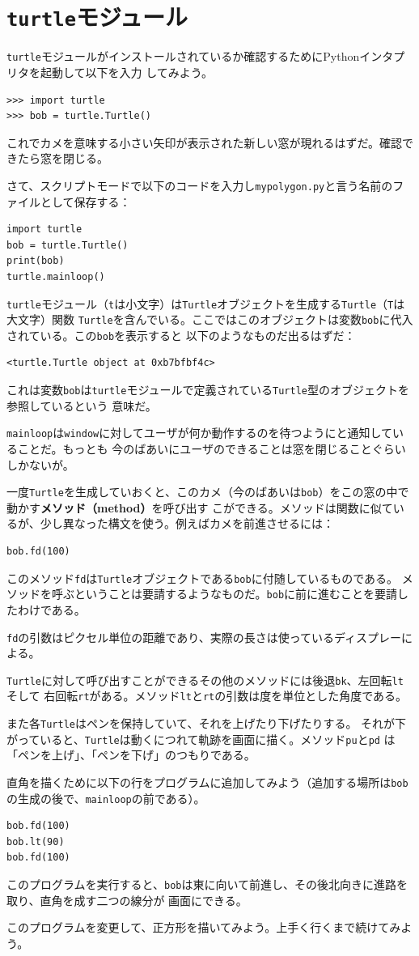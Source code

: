 \documentclass[a4j,12pt,makeidx]{jbook}
\begin{document}
\section{{\tt turtle}モジュール}
{\tt turtle}モジュールがインストールされているか確認するためにPythonインタプリタを起動して以下を入力
してみよう。
\begin{verbatim}
>>> import turtle
>>> bob = turtle.Turtle()
\end{verbatim}
これでカメを意味する小さい矢印が表示された新しい窓が現れるはずだ。確認できたら窓を閉じる。\par
さて、スクリプトモードで以下のコードを入力し{\tt mypolygon.py}と言う名前のファイルとして保存する：
\begin{verbatim}
import turtle
bob = turtle.Turtle()
print(bob)
turtle.mainloop()
\end{verbatim}
{\tt turtle}モジュール（{\tt t}は小文字）は{\tt Turtle}オブジェクトを生成する{\tt Turtle}（{\tt T}は大文字）関数
{\tt Turtle}を含んでいる。ここではこのオブジェクトは変数{\tt bob}に代入されている。この{\tt bob}を表示すると
以下のようなものだ出るはずだ：
\begin{verbatim}
<turtle.Turtle object at 0xb7bfbf4c>
\end{verbatim}
これは変数{\tt bob}は{\tt turtle}モジュールで定義されている{\tt Turtle}型のオブジェクトを参照しているという
意味だ。\par
{\tt mainloop}は{\tt window}に対してユーザが何か動作するのを待つようにと通知していることだ。もっとも
今のばあいにユーザのできることは窓を閉じることぐらいしかないが。\par
一度{\tt Turtle}を生成していおくと、このカメ（今のばあいは{\tt bob}）をこの窓の中で動かす{\bf メソッド（method）}を呼び出す
こができる。メソッドは関数に似ているが、少し異なった構文を使う。例えばカメを前進させるには：
\begin{verbatim}
bob.fd(100)
\end{verbatim}
%
このメソッド{\tt fd}は{\tt Turtle}オブジェクトである{\tt bob}に付随しているものである。
メソッドを呼ぶということは要請するようなものだ。{\tt bob}に前に進むことを要請したわけである。\par
{\tt fd}の引数はピクセル単位の距離であり、実際の長さは使っているディスプレーによる。\par
{\tt Turtle}に対して呼び出すことができるその他のメソッドには後退{\tt bk}、左回転{\tt lt}そして
右回転{\tt rt}がある。メソッド{\tt lt}と{\tt rt}の引数は度を単位とした角度である。\par
また各{\tt Turtle}はペンを保持していて、それを上げたり下げたりする。
それが下がっていると、{\tt Turtle}は動くにつれて軌跡を画面に描く。メソッド{\tt pu}と{\tt pd}
は「ペンを上げ」、「ペンを下げ」のつもりである。\par
直角を描くために以下の行をプログラムに追加してみよう（追加する場所は{\tt bob}の生成の後で、{\tt mainloop}の前である）。
\begin{verbatim}
bob.fd(100)
bob.lt(90)
bob.fd(100)
\end{verbatim}
このプログラムを実行すると、{\tt bob}は東に向いて前進し、その後北向きに進路を取り、直角を成す二つの線分が
画面にできる。\par
このプログラムを変更して、正方形を描いてみよう。上手く行くまで続けてみよう。
%
\end{document}
